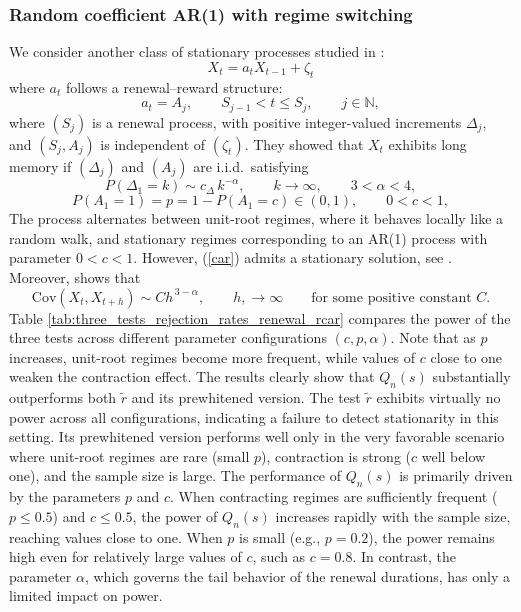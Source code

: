 \documentclass[12pt]{article}
\numberwithin{equation}{section}
\begin{document}
\subsubsection{Random coefficient AR(1) with regime switching}
We consider another class of stationary processes  studied in \cite{Leipus2003}:
\begin{equation}\label{car}
X_t = a_tX_{t-1}+\zeta_t
\end{equation}
where \(a_t\) follows a renewal–reward structure:
\[
a_t = A_j, \qquad S_{j-1} < t \le S_j, \qquad j \in \mathbb{N},
\]
where \((S_j)\) is a renewal process, with positive integer-valued increments $\Delta_j$, and \((S_j, A_j)\) is independent of \((\zeta_t)\).
They showed that $X_t$ exhibits long memory if \((\Delta_j)\) and \((A_j)\) are i.i.d.\ satisfying
\begin{equation*}P(\Delta_1=k)\sim c_\Delta\, k^{-\alpha}, \qquad  k \to \infty,
\qquad 3 < \alpha < 4,
\end{equation*}
$$
P(A_1 = 1)=p=1-P(A_1=c)\in(0,1), \qquad 0<c<1,
$$
The process alternates between unit-root regimes, where it behaves locally like a random walk, and stationary regimes corresponding to an AR(1) process with parameter $0<c<1$. However, (\ref{car}) admits a stationary solution, see \cite{Brandt1986}.
Moreover, \cite{Leipus2003} shows that
\[
\mathrm{Cov}(X_t,X_{t+h})
   \sim Ch^{\,3 - \alpha}, 
\qquad h, \to \infty\qquad\textrm{for some positive constant }C.
\]
Table \ref{tab:three_tests_rejection_rates_renewal_rcar} compares the power of the three tests across different parameter configurations $(c,p,\alpha)$. Note that  as $p$ increases, unit-root regimes become more frequent, while values of $c$ close to one weaken the contraction effect. The results clearly show that $Q_n(s)$ substantially outperforms both $\tilde r$ and its prewhitened version.
The test $\tilde r$ exhibits virtually no power across all configurations, indicating a failure to detect stationarity in this setting. Its prewhitened version performs well only in the very favorable scenario where unit-root regimes are rare (small $p$), contraction is strong ($c$ well below one), and the sample size is large.
The performance of $Q_n(s)$ is primarily driven by the parameters $p$ and $c$. 
When contracting regimes are sufficiently frequent ( $p\le0.5$) and  $c\le0.5$, the power of $Q_n(s)$ increases rapidly with the sample size, reaching values close to one. When $p$ is small (e.g., $p=0.2$), the power remains high even for relatively large values of $c$, such as $c=0.8$. In contrast, the parameter $\alpha$, which governs the tail behavior of the renewal durations, has only a limited impact on power.
\end{document}
